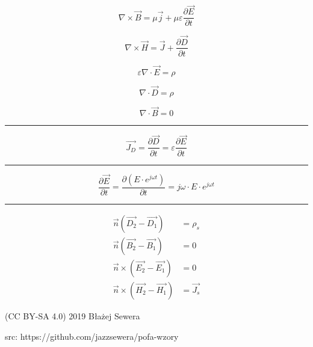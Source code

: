 \documentclass[12pt]{article}
\newenvironment{bottompar}{\par\vspace*{\fill}}{\clearpage}
\newcommand{\grayrule}{{\color{lightgray} \hrule}}
\begin{document}
\begin{multicols}{3}
\begin{equation*}
    \nabla \times \Vec{B} = \mu \Vec{j} + \mu \varepsilon \frac{\partial \Vec{E}}{\partial t}
\end{equation*}

\begin{equation*}
    \nabla \times \Vec{H} = \Vec{J} + \frac{\partial \Vec{D}}{\partial t}
\end{equation*}

\begin{equation*}
    \varepsilon \nabla \cdot \Vec{E} = \rho
\end{equation*}

\begin{equation*}
    \nabla \cdot \Vec{D} = \rho
\end{equation*}

\begin{equation*}
    \nabla \cdot \Vec{B} = 0
\end{equation*}

\grayrule

\begin{equation*}
    \Vec{J_D} = \frac{\partial \Vec{D}}{\partial t}
        = \varepsilon \frac{\partial \Vec{E}}{\partial t}
\end{equation*}

\grayrule

\begin{equation*}
    \frac{\partial \Vec{E}}{\partial t}
        = \frac{\partial (E \cdot e^{j \omega t})}{\partial t}
        = j \omega \cdot E \cdot e^{j \omega t}
\end{equation*}

\grayrule

\begin{equation*}
    \begin{split}
        \Vec{n} (\Vec{D_2} - \Vec{D_1}) &= \rho_s \\
        \Vec{n} (\Vec{B_2} - \Vec{B_1}) &= 0 \\
        \Vec{n} \times (\Vec{E_2} - \Vec{E_1}) &= 0 \\
        \Vec{n} \times (\Vec{H_2} - \Vec{H_1}) &= \Vec{J_s}
    \end{split}
\end{equation*}

\end{multicols}

\begin{bottompar}
    {\footnotesize \ttfamily (CC BY-SA 4.0) 2019 Błażej Sewera \par
    src: https://github.com/jazzsewera/pofa-wzory}
\end{bottompar}

\end{document}

